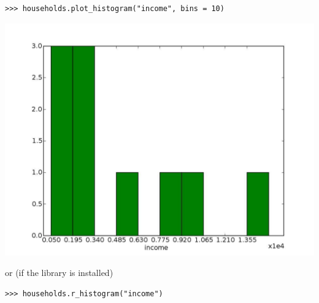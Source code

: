 \histogramindex
\begin{verbatim}
>>> households.plot_histogram("income", bins = 10)
\end{verbatim}
\begin{center}
\includegraphics[scale=0.2, angle=0]{images/incomehist.pdf}
\end{center}
or (if the  \rpyindex library is installed)
\histogramindex
\begin{verbatim}
>>> households.r_histogram("income")
\end{verbatim}
